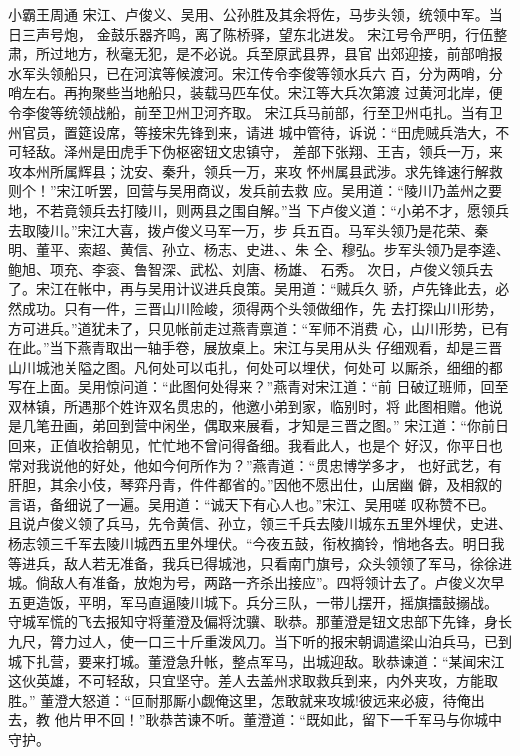 小霸王周通
宋江、卢俊义、吴用、公孙胜及其余将佐，马步头领，统领中军。当日三声号炮，
金鼓乐器齐鸣，离了陈桥驿，望东北进发。
宋江号令严明，行伍整肃，所过地方，秋毫无犯，是不必说。兵至原武县界，县官
出郊迎接，前部哨报水军头领船只，已在河滨等候渡河。宋江传令李俊等领水兵六
百，分为两哨，分哨左右。再拘聚些当地船只，装载马匹车仗。宋江等大兵次第渡
过黄河北岸，便令李俊等统领战船，前至卫州卫河齐取。
宋江兵马前部，行至卫州屯扎。当有卫州官员，置筵设席，等接宋先锋到来，请进
城中管待，诉说：“田虎贼兵浩大，不可轻敌。泽州是田虎手下伪枢密钮文忠镇守，
差部下张翔、王吉，领兵一万，来攻本州所属辉县；沈安、秦升，领兵一万，来攻
怀州属县武涉。求先锋速行解救则个！”宋江听罢，回营与吴用商议，发兵前去救
应。吴用道：“陵川乃盖州之要地，不若竟领兵去打陵川，则两县之围自解。”当
下卢俊义道：“小弟不才，愿领兵去取陵川。”宋江大喜，拨卢俊义马军一万，步
兵五百。马军头领乃是花荣、秦明、董平、索超、黄信、孙立、杨志、史进、、朱
仝、穆弘。步军头领乃是李逵、鲍旭、项充、李衮、鲁智深、武松、刘唐、杨雄、
石秀。
次日，卢俊义领兵去了。宋江在帐中，再与吴用计议进兵良策。吴用道：“贼兵久
骄，卢先锋此去，必然成功。只有一件，三晋山川险峻，须得两个头领做细作，先
去打探山川形势，方可进兵。”道犹未了，只见帐前走过燕青禀道：“军师不消费
心，山川形势，已有在此。”当下燕青取出一轴手卷，展放桌上。宋江与吴用从头
仔细观看，却是三晋山川城池关隘之图。凡何处可以屯扎，何处可以埋伏，何处可
以厮杀，细细的都写在上面。吴用惊问道：“此图何处得来？”燕青对宋江道：“前
日破辽班师，回至双林镇，所遇那个姓许双名贯忠的，他邀小弟到家，临别时，将
此图相赠。他说是几笔丑画，弟回到营中闲坐，偶取来展看，才知是三晋之图。”
宋江道：“你前日回来，正值收拾朝见，忙忙地不曾问得备细。我看此人，也是个
好汉，你平日也常对我说他的好处，他如今何所作为？”燕青道：“贯忠博学多才，
也好武艺，有肝胆，其余小伎，琴弈丹青，件件都省的。”因他不愿出仕，山居幽
僻，及相叙的言语，备细说了一遍。吴用道：“诚天下有心人也。”宋江、吴用嗟
叹称赞不已。
且说卢俊义领了兵马，先令黄信、孙立，领三千兵去陵川城东五里外埋伏，史进、
杨志领三千军去陵川城西五里外埋伏。“今夜五鼓，衔枚摘铃，悄地各去。明日我
等进兵，敌人若无准备，我兵已得城池，只看南门旗号，众头领领了军马，徐徐进
城。倘敌人有准备，放炮为号，两路一齐杀出接应”。四将领计去了。卢俊义次早
五更造饭，平明，军马直逼陵川城下。兵分三队，一带儿摆开，摇旗擂鼓搦战。
守城军慌的飞去报知守将董澄及偏将沈骥、耿恭。那董澄是钮文忠部下先锋，身长
九尺，膂力过人，使一口三十斤重泼风刀。当下听的报宋朝调遣梁山泊兵马，已到
城下扎营，要来打城。董澄急升帐，整点军马，出城迎敌。耿恭谏道：“某闻宋江
这伙英雄，不可轻敌，只宜坚守。差人去盖州求取救兵到来，内外夹攻，方能取胜。”
董澄大怒道：“叵耐那厮小觑俺这里，怎敢就来攻城!彼远来必疲，待俺出去，教
他片甲不回！”耿恭苦谏不听。董澄道：“既如此，留下一千军马与你城中守护。
